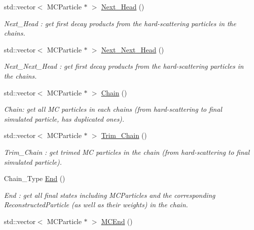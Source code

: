 \begin{DoxyCompactItemize}
std::vector$<$ MCParticle $\ast$ $>$ \hyperlink{classToolSet_1_1CChain__Single_af29a34bb8e658fd38590b7914ad4929f}{Next\_\-Head} ()
\begin{DoxyCompactList}\small\item\em Next\_\-Head : get first decay products from the hard-\/scattering particles in the chains. \item\end{DoxyCompactList}\item 
std::vector$<$ MCParticle $\ast$ $>$ \hyperlink{classToolSet_1_1CChain__Single_a1a7ec13ce17b0ae4ec7562f4c32578d5}{Next\_\-Next\_\-Head} ()
\begin{DoxyCompactList}\small\item\em Next\_\-Next\_\-Head : get first decay products from the hard-\/scattering particles in the chains. \item\end{DoxyCompactList}\item 
std::vector$<$ MCParticle $\ast$ $>$ \hyperlink{classToolSet_1_1CChain__Single_a4dfbe3f7c8f2b7b3c98918db0bdf0e35}{Chain} ()
\begin{DoxyCompactList}\small\item\em Chain: get all MC particles in each chains (from hard-\/scattering to final simulated particle, has duplicated ones). \item\end{DoxyCompactList}\item 
std::vector$<$ MCParticle $\ast$ $>$ \hyperlink{classToolSet_1_1CChain__Single_a8323cc6a1a9f5dd2ef0527324e9140c9}{Trim\_\-Chain} ()
\begin{DoxyCompactList}\small\item\em Trim\_\-Chain : get trimed MC particles in the chain (from hard-\/scattering to final simulated particle). \item\end{DoxyCompactList}\item 
Chain\_\-Type \hyperlink{classToolSet_1_1CChain__Single_a9dc8f3c99668806d5bbe276758a1fc00}{End} ()
\begin{DoxyCompactList}\small\item\em End : get all final states including MCParticles and the corresponding ReconstructedParticle (as well as their weights) in the chain. \item\end{DoxyCompactList}\item 
std::vector$<$ MCParticle $\ast$ $>$ \hyperlink{classToolSet_1_1CChain__Single_a9762b2584dc5f7eef1036fda5dfb98b5}{MCEnd} ()

\end{DoxyCompactItemize}
